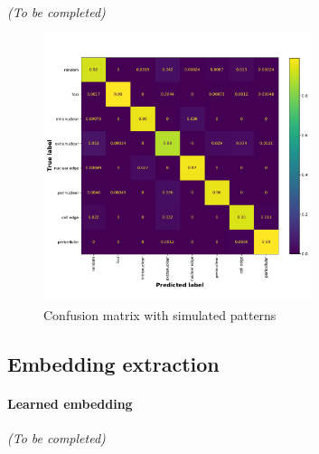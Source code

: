 \begin{center}
	\textit{(To be completed)}
\end{center}




\begin{figure}[h]
    \centering
    \includegraphics[width=0.7\textwidth]{figures/chapter4/confusion_matrix}
    \caption{Confusion matrix with simulated patterns}
    \label{fig:confusion_matrix}
\end{figure}

\subsection{Embedding extraction} \label{subsec:learned_embedding}


\paragraph{Learned embedding}

\begin{center}
	\textit{(To be completed)}
\end{center}

